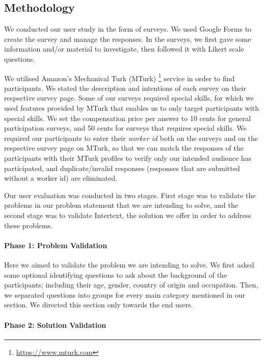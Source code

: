 \subsection{Methodology}

We conducted our user study in the form of surveys. We used Google Forms to create the survey and manage the responses. In the surveys, we first gave some information and/or material to investigate, then followed it with Likert scale questions.

We utilised Amazon's Mechanical Turk (MTurk) \footnote{\url{https://www.mturk.com}} service in order to find participants. We stated the description and intentions of each survey on their respective survey page. Some of our surveys required special skills, for which we used features provided by MTurk that enables us to only target participants with special skills. We set the compensation price per answer to 10 cents for general participation surveys, and 50 cents for surveys that requires special skills. We required our participants to enter their \textit{worker id} both on the surveys and on the respective survey page on MTurk, so that we can match the responses of the participants with their MTurk profiles to verify only our intended audience has participated, and duplicate/invalid responses (responses that are submitted without a worker id) are eliminated.

Our user evaluation was conducted in two stages. First stage was to validate the problems in our problem statement that we are intending to solve, and the second stage was to validate Intertext, the solution we offer in order to address these problems. 

\paragraph{Phase 1: Problem Validation}

Here we aimed to validate the problem we are intending to solve. We first asked some optional identifying questions to ask about the background of the participants; including their age, gender, country of origin and occupation. Then, we separated questions into groups for every main category mentioned in our  section. We directed this section only towards the end users.

\paragraph{Phase 2: Solution Validation}

